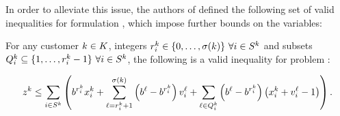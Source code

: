 In order to alleviate this issue, the authors of \cite{ca:rpp} defined the
following set of valid inequalities for formulation \slla, which impose further
bounds on the variables:

\begin{proposition}
    For any customer ${k \in K}$, integers $r_i^k\in\{0,\ldots,\sigma(k)\}~\forall{\ensuremath{i \in S^k}}$
    and subsets $Q_i^k\subseteq\{1,\ldots,r_i^k-1\}~\forall{\ensuremath{i \in S^k}}$, the following
    is a valid inequality for problem \slla:

    \begin{equation}
        z^k \leq \sum_{i \in S^k} \left(
            b^{r_i^k}x_i^k
            + \sum_{\ell=r_i^k+1}^{\sigma\left(k\right)}
                \left(b^\ell - b^{r_i^k}\right) v_i^\ell
            + \sum_{\ell\in Q_i^k}
                \left(b^\ell - b^{r_i^k}\right) \left(x_i^k+v_i^\ell-1\right)
        \right).
        \label{eq:sll1-inequalities}
    \end{equation}
\end{proposition}

